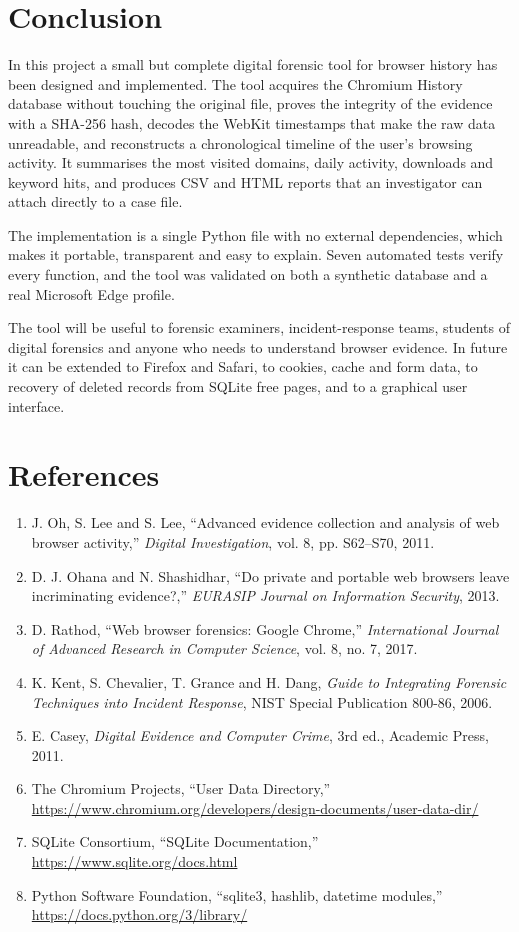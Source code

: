 \documentclass[12pt,a4paper]{article}
\begin{document}
\vspace{1cm}
\section*{Conclusion}\label{sec:concl}
In this project a small but complete digital forensic tool for browser history has been designed and implemented. The tool acquires the Chromium History database without touching the original file, proves the integrity of the evidence with a SHA-256 hash, decodes the WebKit timestamps that make the raw data unreadable, and reconstructs a chronological timeline of the user's browsing activity. It summarises the most visited domains, daily activity, downloads and keyword hits, and produces CSV and HTML reports that an investigator can attach directly to a case file.

The implementation is a single Python file with no external dependencies, which makes it portable, transparent and easy to explain. Seven automated tests verify every function, and the tool was validated on both a synthetic database and a real Microsoft Edge profile.

The tool will be useful to forensic examiners, incident-response teams, students of digital forensics and anyone who needs to understand browser evidence. In future it can be extended to Firefox and Safari, to cookies, cache and form data, to recovery of deleted records from SQLite free pages, and to a graphical user interface.

\newpage
\section*{References}\label{sec:ref}
\begin{enumerate}[nosep]
  \item J. Oh, S. Lee and S. Lee, ``Advanced evidence collection and analysis of web browser activity,'' \emph{Digital Investigation}, vol. 8, pp. S62--S70, 2011.
  \item D. J. Ohana and N. Shashidhar, ``Do private and portable web browsers leave incriminating evidence?,'' \emph{EURASIP Journal on Information Security}, 2013.
  \item D. Rathod, ``Web browser forensics: Google Chrome,'' \emph{International Journal of Advanced Research in Computer Science}, vol. 8, no. 7, 2017.
  \item K. Kent, S. Chevalier, T. Grance and H. Dang, \emph{Guide to Integrating Forensic Techniques into Incident Response}, NIST Special Publication 800-86, 2006.
  \item E. Casey, \emph{Digital Evidence and Computer Crime}, 3rd ed., Academic Press, 2011.
  \item The Chromium Projects, ``User Data Directory,'' \url{https://www.chromium.org/developers/design-documents/user-data-dir/}
  \item SQLite Consortium, ``SQLite Documentation,'' \url{https://www.sqlite.org/docs.html}
  \item Python Software Foundation, ``sqlite3, hashlib, datetime modules,'' \url{https://docs.python.org/3/library/}
\end{enumerate}
\end{document}
